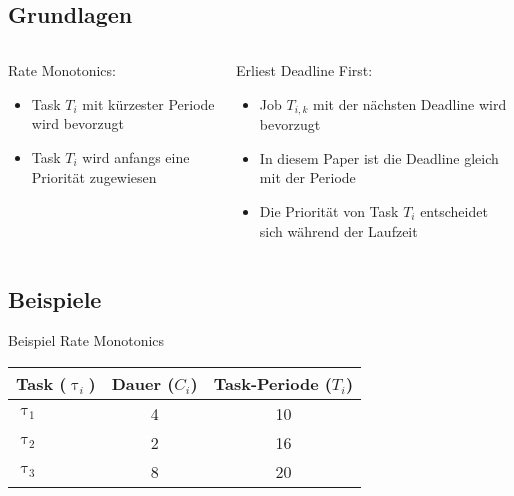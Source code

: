 \subsection{Grundlagen}
\begin{frame}{\subsecname}
		\begin{columns}[]
  			\begin{column}{0.5\textwidth}
				Rate Monotonics:
				\begin{itemize}
					\item Task $T_i$ mit kürzester Periode wird bevorzugt
					\item Task $T_i$ wird anfangs eine Priorität zugewiesen
				\end{itemize}

			\end{column}
  			\begin{column}{0.5\textwidth}
  				Erliest Deadline First:
				\begin{itemize}
					\item Job $T_{i, k}$ mit der nächsten Deadline wird bevorzugt
					\item In diesem Paper ist die Deadline gleich mit der Periode
					\item Die Priorität von Task $T_i$ entscheidet sich während der Laufzeit
				\end{itemize}	
  			\end{column}
		\end{columns}
\end{frame}

\subsection{Beispiele}

\newcommand{\showRMSlide}[1] {\begin{frame}{Beispiel Rate Monotonics}
	\begin{center}
		\begin{tabular}{l||c|c}
				Task ($\uptau_i$) & Dauer ($C_i$) & Task-Periode ($T_i$)\\\hline\hline
				$\uptau_1$ & 4 & 10\\
				$\uptau_2$ & 2 & 16\\
				$\uptau_3$ & 8 & 20\\
		\end{tabular}
	\end{center}
	
\end{frame}}

%
{%
	\showRMSlide{\arabic{ct}}
}

